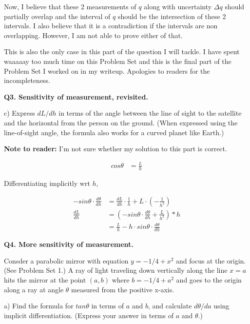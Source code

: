 \documentclass[9pt]{article}
\begin{document}
Now, I believe that these 2 measurements of $q$ along with uncertainty $\Delta q$ should partially overlap and the interval of $q$ should be the intersection of these 2 intervals. I also believe that it is a contradiction if the intervals are non overlapping. However, I am not able to prove either of that.

This is also the only case in this part of the question I will tackle. I have spent waaaaay too much time on this Problem Set and this is the final part of the Problem Set I worked on in my writeup. Apologies to readers for the incompleteness.

\begin{tcolorbox}
  \textbf{Q3. Sensitivity of measurement, revisited.}

  c) Express $dL/dh$ in terms of the angle between the line of sight to the satellite and the horizontal from the person on the ground. (When expressed using the line-of-sight angle, the formula also works for a curved planet like Earth.)
\end{tcolorbox}

\textbf{Note to reader:} I'm not sure whether my solution to this part is correct.

\begin{align*}
  cos \theta &= \frac{L}{h}
\end{align*}

Differentiating implicitly wrt $h$,

\begin{align*}
  -sin\theta \cdot \frac{d\theta}{dh} &= \frac{dL}{dh} \cdot \frac{1}{h} + L \cdot (-\frac{1}{h^2}) \\
  \frac{dL}{dh} &= (-sin\theta \cdot \frac{d\theta}{dh} + \frac{L}{h^2}) * h \\
                &= \frac{L}{h} - h \cdot sin\theta \cdot \frac{d\theta}{dh}
\end{align*}



\begin{tcolorbox}
  \textbf{Q4. More sensitivity of measurement.}

  Consder a parabolic mirror with equation $y = -1/4 + x^2$ and focus at the origin. (See Problem Set 1.) A ray of light traveling down vertically along the line $x = a$ hits the mirror at the point $(a, b)$ where $b = -1/4 + a^2$ and goes to the origin along a ray at angle $\theta$ measured from the positive x-axis.

  a) Find the formula for $tan\theta$ in terms of $a$ and $b$, and calculate $d\theta / da$ using implicit differentiation. (Express your answer in terms of $a$ and $\theta$.)
\end{tcolorbox}
\end{document}
